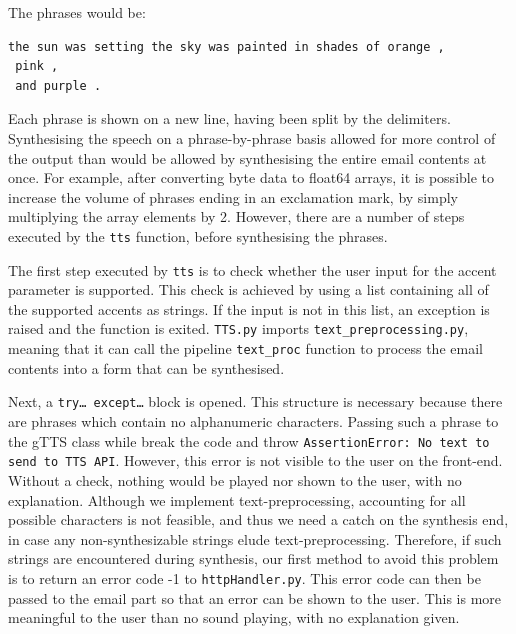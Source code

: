 \documentclass{article}
\begin{document}
The phrases would be:
\begin{lstlisting}
the sun was setting the sky was painted in shades of orange , 
 pink , 
 and purple . 
\end{lstlisting}


Each phrase is shown on a new line, having been split by the delimiters. Synthesising the speech on a phrase-by-phrase basis allowed for more control of the output than would be allowed by synthesising the entire email contents at once. For example, after converting byte data to float64 arrays, it is possible to increase the volume of phrases ending in an exclamation mark, by simply multiplying the array elements by 2. However, there are a number of steps executed by the \texttt{tts} function, before synthesising the phrases.

The first step executed by \texttt{tts} is to check whether the user input for the accent parameter is supported. This check is achieved by using a list containing all of the supported accents as strings. If the input is not in this list, an exception is raised and the function is exited. \texttt{TTS.py} imports \texttt{text\_preprocessing.py}, meaning that it can call the pipeline \texttt{text\_proc}  function to process the email contents into a form that can be synthesised. 

Next, a \texttt{try… except…} block is opened. This structure is necessary because there are phrases which contain no alphanumeric characters. Passing such a phrase to the gTTS class while break the code and throw \texttt{AssertionError: No text to send to TTS API}. However, this error is not visible to the user on the front-end. Without a check, nothing would be played nor shown to the user, with no explanation. Although we implement text-preprocessing, accounting for all possible characters is not feasible, and thus we need a catch on the synthesis end, in case any non-synthesizable strings elude text-preprocessing. Therefore, if such strings are encountered during synthesis, our first method to avoid this problem is to return an error code -1 to \texttt{httpHandler.py}. This error code can then be passed to the email part so that an error can be shown to the user. This is more meaningful to the user than no sound playing, with no explanation given.
\end{document}
